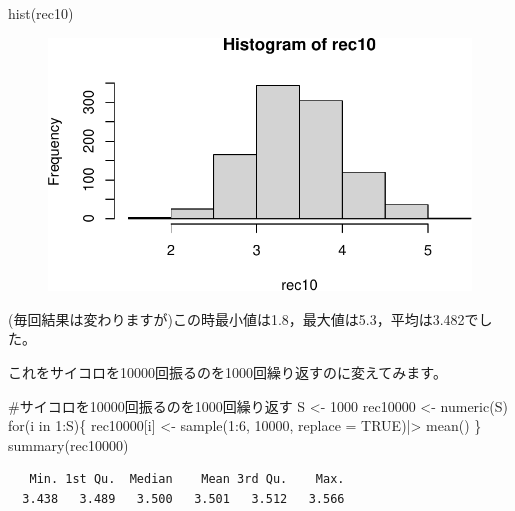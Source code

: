 \documentclass[
  letterpaper,
  DIV=11,
  numbers=noendperiod]{scrreprt}
\newenvironment{Shaded}{\begin{snugshade}}{\end{snugshade}}
\newcommand{\AttributeTok}[1]{\textcolor[rgb]{0.40,0.45,0.13}{#1}}
\newcommand{\CommentTok}[1]{\textcolor[rgb]{0.37,0.37,0.37}{#1}}
\newcommand{\ConstantTok}[1]{\textcolor[rgb]{0.56,0.35,0.01}{#1}}
\newcommand{\ControlFlowTok}[1]{\textcolor[rgb]{0.00,0.23,0.31}{#1}}
\newcommand{\DecValTok}[1]{\textcolor[rgb]{0.68,0.00,0.00}{#1}}
\newcommand{\FunctionTok}[1]{\textcolor[rgb]{0.28,0.35,0.67}{#1}}
\newcommand{\NormalTok}[1]{\textcolor[rgb]{0.00,0.23,0.31}{#1}}
\newcommand{\OtherTok}[1]{\textcolor[rgb]{0.00,0.23,0.31}{#1}}
\newcommand{\SpecialCharTok}[1]{\textcolor[rgb]{0.37,0.37,0.37}{#1}}
\begin{document}
\begin{Shaded}
\begin{Highlighting}[]
\FunctionTok{hist}\NormalTok{(rec10)}
\end{Highlighting}
\end{Shaded}

\begin{figure}[H]

{\centering \includegraphics{6_hyohon_files/figure-pdf/unnamed-chunk-4-1.pdf}

}

\end{figure}

(毎回結果は変わりますが)この時最小値は1.8，最大値は5.3，平均は3.482でした。

これをサイコロを10000回振るのを1000回繰り返すのに変えてみます。

\begin{Shaded}
\begin{Highlighting}[]
\CommentTok{\#サイコロを10000回振るのを1000回繰り返す}
\NormalTok{S }\OtherTok{\textless{}{-}} \DecValTok{1000}
\NormalTok{rec10000 }\OtherTok{\textless{}{-}} \FunctionTok{numeric}\NormalTok{(S)}
\ControlFlowTok{for}\NormalTok{(i }\ControlFlowTok{in} \DecValTok{1}\SpecialCharTok{:}\NormalTok{S)\{}
\NormalTok{  rec10000[i] }\OtherTok{\textless{}{-}} \FunctionTok{sample}\NormalTok{(}\DecValTok{1}\SpecialCharTok{:}\DecValTok{6}\NormalTok{, }\DecValTok{10000}\NormalTok{, }\AttributeTok{replace =} \ConstantTok{TRUE}\NormalTok{)}\SpecialCharTok{|\textgreater{}}
    \FunctionTok{mean}\NormalTok{()}
\NormalTok{\}}
\FunctionTok{summary}\NormalTok{(rec10000)}
\end{Highlighting}
\end{Shaded}

\begin{verbatim}
   Min. 1st Qu.  Median    Mean 3rd Qu.    Max. 
  3.438   3.489   3.500   3.501   3.512   3.566 
\end{verbatim}
\end{document}
